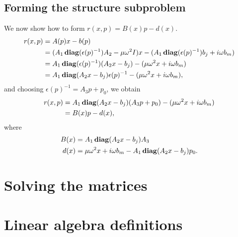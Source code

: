 \documentclass{article}
\begin{document}
\begin{appendix}
\subsection{Forming the structure subproblem}
We now show how to form $r(x,p) = B(x)p - d(x)$.
    \begin{subequations}\begin{align}
    r(x,p) &= A(p)x - b(p) \\
        &= (A_1 \mathop{\bf diag}(\epsilon(p)^{-1}) A_2 - \mu \omega^2 I) x - 
            (A_1 \mathop{\bf diag}(\epsilon(p)^{-1}) b_j + i \omega b_m) \\ 
        &= A_1 \mathop{\bf diag}(\epsilon(p)^{-1}) (A_2 x - b_j) - 
            (\mu \omega^2 x + i \omega b_m) \\ 
        &= A_1 \mathop{\bf diag}(A_2 x - b_j) \epsilon(p)^{-1} - 
            (\mu \omega^2 x + i \omega b_m),
    \end{align}\end{subequations}
    and choosing $\epsilon(p)^{-1} = A_3 p + p_0$, we obtain
    \begin{subequations}\begin{align}
    r(x,p) &= A_1 \mathop{\bf diag}(A_2 x - b_j) (A_3 p + p_0) - 
            (\mu \omega^2 x + i \omega b_m) \\
        &= B(x) p - d(x),
    \end{align}\end{subequations}
    where
    \begin{subequations}\begin{align}
    B(x) &= A_1 \mathop{\bf diag}(A_2 x - b_j) A_3\\
    d(x) &= \mu \omega^2 x + i \omega b_m - A_1 \mathop{\bf diag}(A_2 x - b_j) p_0.
    \end{align}\end{subequations}

\section{Solving the matrices}
\section{Linear algebra definitions}

\end{appendix}
\end{document}
